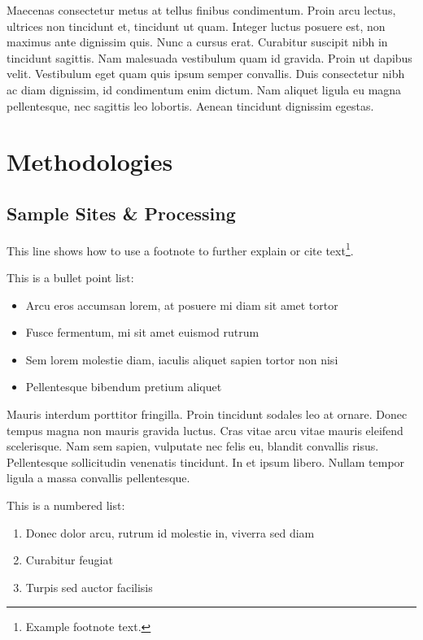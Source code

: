 \documentclass[a4paper]{LTJournalArticle}
\begin{document}
	Maecenas consectetur metus at tellus finibus condimentum. Proin arcu lectus, ultrices non tincidunt et, tincidunt ut quam. Integer luctus posuere est, non maximus ante dignissim quis. Nunc a cursus erat. Curabitur suscipit nibh in tincidunt sagittis. Nam malesuada vestibulum quam id gravida. Proin ut dapibus velit. Vestibulum eget quam quis ipsum semper convallis. Duis consectetur nibh ac diam dignissim, id condimentum enim dictum. Nam aliquet ligula eu magna pellentesque, nec sagittis leo lobortis. Aenean tincidunt dignissim egestas.
	
	
	\section{Methodologies}
	
	\subsection{Sample Sites \& Processing}
	
	This line shows how to use a footnote to further explain or cite text\footnote{Example footnote text.}.
	
	This is a bullet point list:
	
	\begin{itemize}
		\item Arcu eros accumsan lorem, at posuere mi diam sit amet tortor
		\item Fusce fermentum, mi sit amet euismod rutrum
		\item Sem lorem molestie diam, iaculis aliquet sapien tortor non nisi
		\item Pellentesque bibendum pretium aliquet
	\end{itemize}
	
	Mauris interdum porttitor fringilla. Proin tincidunt sodales leo at ornare. Donec tempus magna non mauris gravida luctus. Cras vitae arcu vitae mauris eleifend scelerisque. Nam sem sapien, vulputate nec felis eu, blandit convallis risus. Pellentesque sollicitudin venenatis tincidunt. In et ipsum libero. Nullam tempor ligula a massa convallis pellentesque.
	
	This is a numbered list:
	
	\begin{enumerate}
		\item Donec dolor arcu, rutrum id molestie in, viverra sed diam
		\item Curabitur feugiat
		\item Turpis sed auctor facilisis
	\end{enumerate}
	
\end{document}
